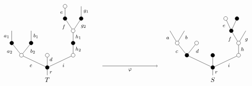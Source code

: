 \documentclass[a4paper,10pt
,draft
]{article}%
\numberwithin{equation}{section}
\numberwithin{figure}{section}
\theoremstyle{definition} %
\newcommand{\1}{\ensuremath{\mathbbm 1}}%
\begin{document}
\begin{equation}\label{ALTTREES EQ}
\begin{tikzpicture}[grow=up,auto,level distance=1.9em,
every node/.style = {font=\footnotesize},
dummy/.style={circle,draw,inner sep=0pt,minimum size=2.1mm}]
\tikzstyle{level 2}=[sibling distance = 4em]
\tikzstyle{level 3}=[sibling distance = 3em]
\tikzstyle{level 4}=[sibling distance = 4em]
\tikzstyle{level 5}=[sibling distance = 2.5em]
\node at (0,0) [font=\normalsize]{$T$}
		child{node [dummy,fill = black] {}
			child{node [dummy,fill=white] {}
				child{node [dummy,fill=black] {}
					child{node [dummy,fill=white] {}
						child{node [dummy,fill = black] {}
							child{
							edge from parent node [swap] {$g_1$}}
						edge from parent node [swap,near end] {$g_2$}}
						child{node [dummy,fill = black] {}
							child{node [dummy,fill=white] {}
							edge from parent node  {$e$}}
						edge from parent node [near end] {$f$}}
					edge from parent node [swap] {$h_1$}}
				edge from parent node [swap] {$h_2$}}
			edge from parent node [swap] {$i$}}
			child{node [dummy,fill=white] {}
			edge from parent node [swap, near end] {$d\phantom{1}$}}
			child{node [dummy,fill=white] {}
				child{node [dummy,fill=black] {}
					child{
					edge from parent node [swap] {$b_1$}}
				edge from parent node [swap,near end] {$b_2$}}
				child{node [dummy,fill=black] {}
					child{
					edge from parent node {$\phantom{b}a_1$}}
				edge from parent node [near end] {$\phantom{b}a_2$}}
			edge from parent node {$\phantom{1}c$}}
		edge from parent node [swap] {$r$}};

\begin{scope}[level distance=1.9em]
\tikzstyle{level 2}=[sibling distance = 4em]
\tikzstyle{level 3}=[sibling distance = 3em]
\tikzstyle{level 4}=[sibling distance = 2.25em]
\tikzstyle{level 5}=[sibling distance = 1.75em]
\node at (9,0) [font = \normalsize] {$S$}
	child{node [dummy,fill = black] {}
		child{node [dummy,fill = white] {}
			child{node [dummy,fill=white] {}
				child{
				edge from parent node [swap] {$g$}}
				child{node [dummy,fill = black] {}
					child{node [dummy,fill=black] {}
					}
					child{node [dummy,fill=white] {}
					edge from parent node [near end] {$e$}}
				edge from parent node [near end] {$f$}}
			edge from parent node [swap] {$h\phantom{1}$}}
		edge from parent node [swap] {$i$}}
		child{node [dummy,fill = black] {}
		}
		child{node [dummy,fill = black] {}
			child{node [dummy,fill=white] {}
				edge from parent node [swap, near end] {$d$}}
			child{node [dummy,fill=white] {}
				child{
				edge from parent node [swap,near end]{$b$}}
				child{
				edge from parent node [near end]{$\phantom{b}a$}}
				edge from parent node [near end] {$\phantom{d}c$}}
		}
	edge from parent node [swap] {$r$}};
\end{scope}
\draw [->] (3,0.75) -- node [swap] {$\varphi$} (6,0.75);
\end{tikzpicture}
\end{equation}
\end{document}
